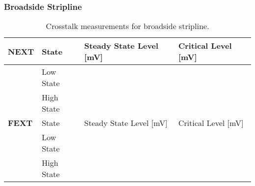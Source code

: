 \documentclass[../main.tex]{subfiles}
\begin{document}
\subsubsection{Broadside Stripline}

\begin{table}[h]
    \centering
    \begin{tabular}{l l|l l}
        \toprule[1pt]
        \textbf{NEXT} & State & Steady State Level [mV] & Critical Level [mV] \\
        \midrule
        & Low State & & \\
        & High State & & \\
        \midrule[1pt]
        \textbf{FEXT} & State & Steady State Level [mV] & Critical Level [mV] \\
        \midrule
        & Low State & & \\
        & High State & & \\
        \bottomrule[1pt]
    \end{tabular}
    \caption{Crosstalk measurements for broadside stripline.}
    \label{tab:calc-broadside-stripline}
\end{table}
\end{document}
